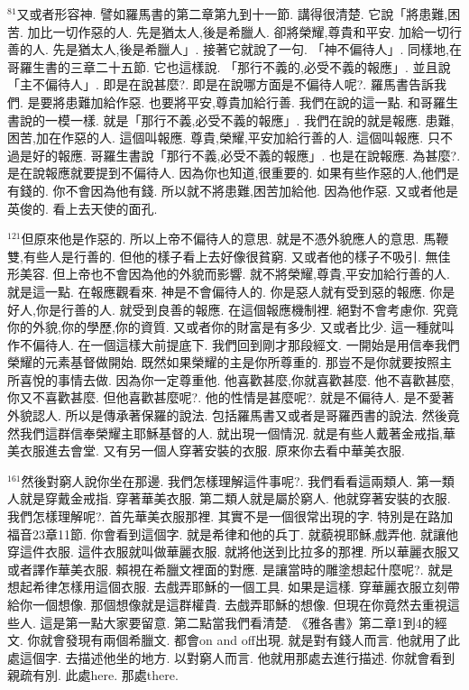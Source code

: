 \documentclass{book}
\begin{document}
$^{81}$又或者形容神.
譬如羅馬書的第二章第九到十一節.
講得很清楚.
它說「將患難,困苦.
加比一切作惡的人.
先是猶太人,後是希臘人.
卻將榮耀,尊貴和平安.
加給一切行善的人.
先是猶太人,後是希臘人」.
接著它就說了一句.
「神不偏待人」.
同樣地,在哥羅生書的三章二十五節.
它也這樣說.
「那行不義的,必受不義的報應」.
並且說「主不偏待人」.
即是在說甚麼?.
即是在說哪方面是不偏待人呢?.
羅馬書告訴我們.
是要將患難加給作惡.
也要將平安,尊貴加給行善.
我們在說的這一點.
和哥羅生書說的一模一樣.
就是「那行不義,必受不義的報應」.
我們在說的就是報應.
患難,困苦,加在作惡的人.
這個叫報應.
尊貴,榮耀,平安加給行善的人.
這個叫報應.
只不過是好的報應.
哥羅生書說「那行不義,必受不義的報應」.
也是在說報應.
為甚麼?.
是在說報應就要提到不偏待人.
因為你也知道,很重要的.
如果有些作惡的人,他們是有錢的.
你不會因為他有錢.
所以就不將患難,困苦加給他.
因為他作惡.
又或者他是英俊的.
看上去天使的面孔.

$^{121}$但原來他是作惡的.
所以上帝不偏待人的意思.
就是不憑外貌應人的意思.
馬鞭雙,有些人是行善的.
但他的樣子看上去好像很貧窮.
又或者他的樣子不吸引.
無佳形美容.
但上帝也不會因為他的外貌而影響.
就不將榮耀,尊貴,平安加給行善的人.
就是這一點.
在報應觀看來.
神是不會偏待人的.
你是惡人就有受到惡的報應.
你是好人,你是行善的人.
就受到良善的報應.
在這個報應機制裡.
絕對不會考慮你.
究竟你的外貌,你的學歷,你的資質.
又或者你的財富是有多少.
又或者比少.
這一種就叫作不偏待人.
在一個這樣大前提底下.
我們回到剛才那段經文.
一開始是用信奉我們榮耀的元素基督做開始.
既然如果榮耀的主是你所尊重的.
那豈不是你就要按照主所喜悅的事情去做.
因為你一定尊重他.
他喜歡甚麼,你就喜歡甚麼.
他不喜歡甚麼,你又不喜歡甚麼.
但他喜歡甚麼呢?.
他的性情是甚麼呢?.
就是不偏待人.
是不愛著外貌認人.
所以是傳承著保羅的說法.
包括羅馬書又或者是哥羅西書的說法.
然後竟然我們這群信奉榮耀主耶穌基督的人.
就出現一個情況.
就是有些人戴著金戒指,華美衣服進去會堂.
又有另一個人穿著安裝的衣服.
原來你去看中華美衣服.

$^{161}$然後對窮人說你坐在那邊.
我們怎樣理解這件事呢?.
我們看看這兩類人.
第一類人就是穿戴金戒指.
穿著華美衣服.
第二類人就是屬於窮人.
他就穿著安裝的衣服.
我們怎樣理解呢?.
首先華美衣服那裡.
其實不是一個很常出現的字.
特別是在路加福音23章11節.
你會看到這個字.
就是希律和他的兵丁.
就藐視耶穌,戲弄他.
就讓他穿這件衣服.
這件衣服就叫做華麗衣服.
就將他送到比拉多的那裡.
所以華麗衣服又或者譯作華美衣服.
賴視在希臘文裡面的對應.
是讓當時的雕塗想起什麼呢?.
就是想起希律怎樣用這個衣服.
去戲弄耶穌的一個工具.
如果是這樣.
穿華麗衣服立刻帶給你一個想像.
那個想像就是這群權貴.
去戲弄耶穌的想像.
但現在你竟然去重視這些人.
這是第一點大家要留意.
第二點當我們看清楚.
《雅各書》第二章1到4的經文.
你就會發現有兩個希臘文.
都會on and off出現.
就是對有錢人而言.
他就用了此處這個字.
去描述他坐的地方.
以對窮人而言.
他就用那處去進行描述.
你就會看到親疏有別.
此處here.
那處there.
\end{document}
